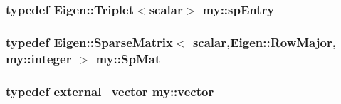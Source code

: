 \hypertarget{namespacemy_a9064fadfc17c5a260a26b7de6d559a5f}{
\subsubsection[{sp\+Entry}]{\setlength{\rightskip}{0pt plus 5cm}typedef Eigen\+::\+Triplet$<${\bf scalar}$>$ {\bf my\+::sp\+Entry}}}\label{namespacemy_a9064fadfc17c5a260a26b7de6d559a5f}
\hypertarget{namespacemy_acdfb73d96fa976b10c1b9769cf5e9a93}{
\subsubsection[{Sp\+Mat}]{\setlength{\rightskip}{0pt plus 5cm}typedef Eigen\+::\+Sparse\+Matrix$<$ {\bf scalar},Eigen\+::\+Row\+Major, {\bf my\+::integer} $>$ {\bf my\+::\+Sp\+Mat}}}\label{namespacemy_acdfb73d96fa976b10c1b9769cf5e9a93}
\hypertarget{namespacemy_ae5357c26097990af91eec62b547ff125}{
\subsubsection[{vector}]{\setlength{\rightskip}{0pt plus 5cm}typedef {\bf external\+\_\+vector} {\bf my\+::vector}}}\label{namespacemy_ae5357c26097990af91eec62b547ff125}
